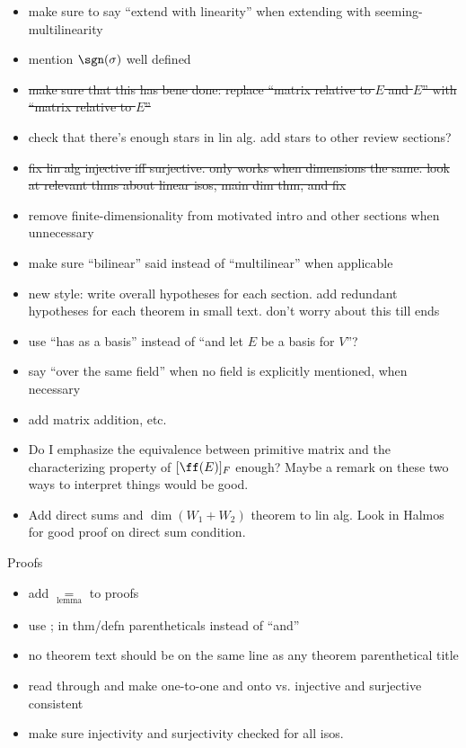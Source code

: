\begin{itemize}
    \item make sure to say ``extend with linearity'' when extending with seeming-multilinearity
    \item mention $\sgn(\sigma)$ well defined
    \item \sout{make sure that this has bene done: replace ``matrix relative to $E$ and $E$'' with ``matrix relative to $E$''}
    \item check that there's enough stars in lin alg. add stars to other review sections?
    \item \sout{fix lin alg injective iff surjective. only works when dimensions the same. look at relevant thms about linear isos, main dim thm, and fix}
    \item remove finite-dimensionality from motivated intro and other sections when unnecessary
    \item make sure ``bilinear'' said instead of ``multilinear'' when applicable
    \item new style: write overall hypotheses for each section. add redundant hypotheses for each theorem in small text. don't worry about this till ends
    \item use ``has as a basis'' instead of ``and let $E$ be a basis for $V$''?
    \item say ``over the same field'' when no field is explicitly mentioned, when necessary
    \item add matrix addition, etc.
    \item Do I emphasize the equivalence between primitive matrix and the characterizing property of $[\ff(E)]_F$ enough? Maybe a remark on these two ways to interpret things would be good.
    \item Add direct sums and $\dim(W_1 + W_2)$ theorem to lin alg. Look in Halmos for good proof on direct sum condition.
\end{itemize}

Proofs

\begin{itemize}
    \item add $\underset{\text{lemma}}{=}$ to proofs
    \item use ; in thm/defn parentheticals instead of ``and''
    \item no theorem text should be on the same line as any theorem parenthetical title
    \item read through and make one-to-one and onto vs. injective and surjective consistent
    \item make sure injectivity and surjectivity checked for all isos.
\end{itemize}

